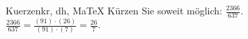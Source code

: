 \begin{MAufgabe}{Kuerzen}{kr, dh, MaTeX}
K\"urzen Sie soweit m\"oglich: $\frac{2366}{637}$.\\ 
\ifLsg\MLoesung
\quad $\frac{2366}{637}=\frac{(91)\cdot(26)}{(91)\cdot(7)}=\frac{26}{7}$.\else\relax\fi
 \end{MAufgabe}